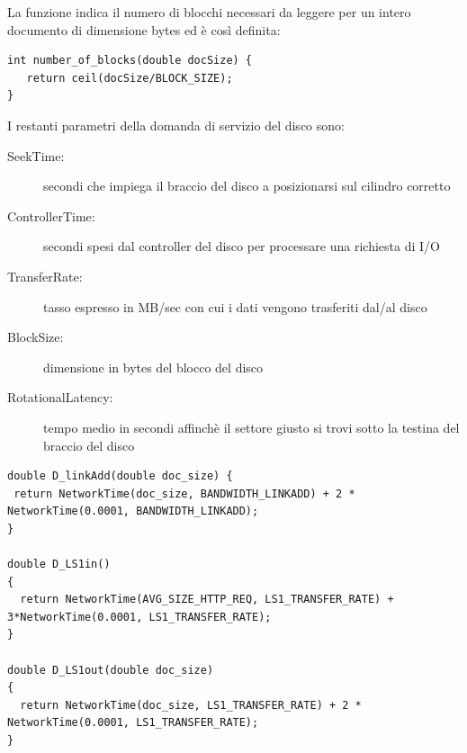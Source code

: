La funzione  indica il numero di blocchi necessari da leggere per un intero documento di dimensione  bytes ed è così definita:
\begin{lstlisting}
int number_of_blocks(double docSize) { 
   return ceil(docSize/BLOCK_SIZE);
}
\end{lstlisting}
I restanti parametri della domanda di servizio del disco sono:
\begin{description}
	\item[SeekTime:] secondi che impiega il braccio del disco a posizionarsi sul cilindro corretto 
	\item[ControllerTime:] secondi spesi dal controller del disco per processare una richiesta di I/O 
	\item[TransferRate:] tasso espresso in MB/sec con cui i dati vengono trasferiti dal/al disco 
	\item[BlockSize:] dimensione in bytes del blocco del disco 
	\item[RotationalLatency:] tempo medio in secondi affinchè il settore giusto si trovi sotto la testina del braccio del disco 
\end{description}
\begin{lstlisting}
double D_linkAdd(double doc_size) { 
 return NetworkTime(doc_size, BANDWIDTH_LINKADD) + 2 * NetworkTime(0.0001, BANDWIDTH_LINKADD); 
} 

double D_LS1in() 
{ 
  return NetworkTime(AVG_SIZE_HTTP_REQ, LS1_TRANSFER_RATE) + 3*NetworkTime(0.0001, LS1_TRANSFER_RATE); 
} 

double D_LS1out(double doc_size) 
{ 
  return NetworkTime(doc_size, LS1_TRANSFER_RATE) + 2 * NetworkTime(0.0001, LS1_TRANSFER_RATE); 
}
\end{lstlisting}
